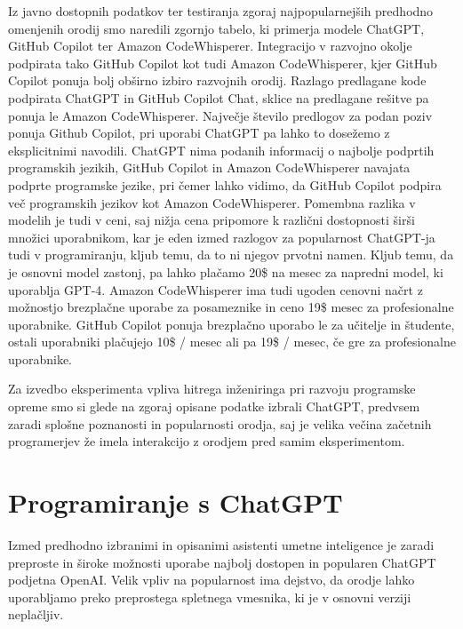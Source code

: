 \documentclass[a4paper,12pt,openright]{book}
\begin{document}
Iz javno dostopnih podatkov ter testiranja zgoraj najpopularnejših predhodno omenjenih orodij smo naredili zgornjo tabelo, ki primerja modele ChatGPT, GitHub Copilot ter Amazon CodeWhisperer. Integracijo v razvojno okolje podpirata tako GitHub Copilot kot tudi Amazon CodeWhisperer, kjer GitHub Copilot ponuja bolj obširno izbiro razvojnih orodij. Razlago predlagane kode podpirata ChatGPT in GitHub Copilot Chat, sklice na predlagane rešitve pa ponuja le Amazon CodeWhisperer. Največje število predlogov za podan poziv ponuja Github Copilot, pri uporabi ChatGPT pa lahko to dosežemo z eksplicitnimi navodili. ChatGPT nima podanih informacij o najbolje podprtih programskih jezikih, GitHub Copilot in Amazon CodeWhisperer navajata podprte programske jezike, pri čemer lahko vidimo, da GitHub Copilot podpira več programskih jezikov kot Amazon CodeWhisperer. Pomembna razlika v modelih je tudi v ceni, saj nižja cena pripomore k različni dostopnosti širši množici uporabnikom, kar je eden izmed razlogov za popularnost ChatGPT-ja tudi v programiranju, kljub temu, da to ni njegov prvotni namen. Kljub temu, da je osnovni model zastonj, pa lahko plačamo 20\$ na mesec za napredni model, ki uporablja GPT-4. Amazon CodeWhisperer ima tudi ugoden cenovni načrt z možnostjo brezplačne uporabe za posameznike in ceno 19\$ mesec za profesionalne uporabnike. GitHub Copilot ponuja brezplačno uporabo le za učitelje in študente, ostali uporabniki plačujejo 10\$ / mesec ali pa 19\$ / mesec, če gre za profesionalne uporabnike.
\cite{github_copilot_chat, openai_chatgpt, saasworthy_codewhisperer}

Za izvedbo eksperimenta vpliva hitrega inženiringa pri razvoju programske opreme smo si glede na zgoraj opisane podatke izbrali ChatGPT, predvsem zaradi splošne poznanosti in popularnosti orodja, saj je velika večina začetnih programerjev že imela interakcijo z orodjem pred samim eksperimentom.

\section{Programiranje s ChatGPT}
Izmed predhodno izbranimi in opisanimi asistenti umetne inteligence je zaradi preproste in široke možnosti uporabe najbolj dostopen in popularen ChatGPT podjetna OpenAI. Velik vpliv na popularnost ima dejstvo, da orodje lahko uporabljamo preko preprostega spletnega vmesnika, ki je v osnovni verziji neplačljiv.
\end{document}
